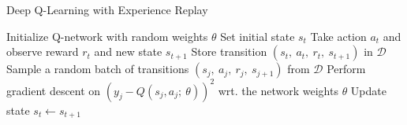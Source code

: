 \begin{algorithm}[H]
  \caption[Deep Q-Learning]{Deep Q-Learning with Experience Replay}
  \label{alg:deep_q_learning}
  \begin{algorithmic}
    \State Initialize Q-network with random weights $\theta$
    \State Set initial state $s_t$
    \State Take action $a_t$ and observe reward $r_t$ and new state $s_{t+1}$
    \State Store transition $(s_t,~a_t,~r_t,~s_{t+1})$ in $\mathcal{D}$
    \State Sample a random batch of transitions $(s_j,~a_j,~r_j,~s_{j+1})$ from $\mathcal{D}$
    \State Perform gradient descent on $(y_j - Q(s_j,a_j;~\theta))^2$ wrt. the network weights $\theta$
    \State Update state $s_t \gets s_{t+1}$
    \EndWhile
    \EndFor
  \end{algorithmic}
\end{algorithm}
